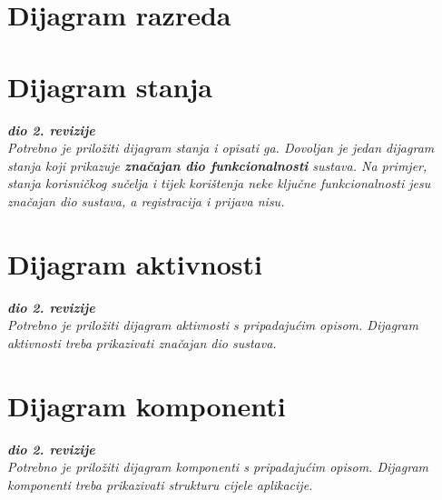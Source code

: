 			\eject
			
			
		\section{Dijagram razreda}
		

			
			
			
			\eject
		
		\section{Dijagram stanja}
			
			
			\textbf{\textit{dio 2. revizije}}\\
			
			\textit{Potrebno je priložiti dijagram stanja i opisati ga. Dovoljan je jedan dijagram stanja koji prikazuje \textbf{značajan dio funkcionalnosti} sustava. Na primjer, stanja korisničkog sučelja i tijek korištenja neke ključne funkcionalnosti jesu značajan dio sustava, a registracija i prijava nisu. }
			
			
			\eject 
		
		\section{Dijagram aktivnosti}
			
			\textbf{\textit{dio 2. revizije}}\\
			
			 \textit{Potrebno je priložiti dijagram aktivnosti s pripadajućim opisom. Dijagram aktivnosti treba prikazivati značajan dio sustava.}
			
			\eject
		\section{Dijagram komponenti}
		
			\textbf{\textit{dio 2. revizije}}\\
		
			 \textit{Potrebno je priložiti dijagram komponenti s pripadajućim opisom. Dijagram komponenti treba prikazivati strukturu cijele aplikacije.}